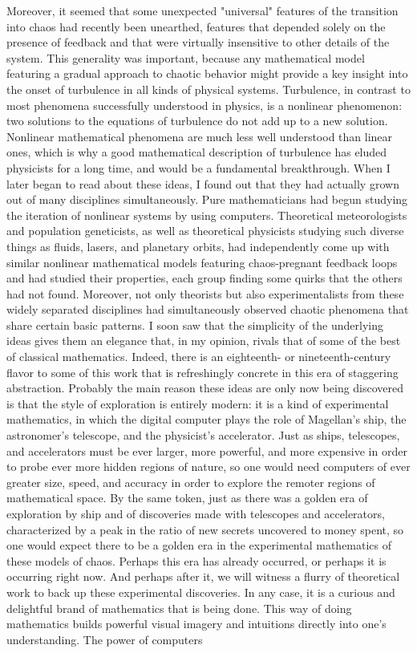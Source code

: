         Moreover, it seemed that some unexpected "universal" features of the
transition into chaos had recently been unearthed, features that depended solely on the
presence of feedback and that were virtually insensitive to other details of the system.
This generality was important, because any mathematical model featuring a gradual
approach to chaotic behavior might provide a key insight into the onset of turbulence
in all kinds of physical systems. Turbulence, in contrast to most phenomena
successfully understood in physics, is a nonlinear phenomenon: two solutions to the
equations of turbulence do not add up to a new solution. Nonlinear mathematical
phenomena are much less well understood than linear ones, which is why a good
mathematical description of turbulence has eluded physicists for a long time, and
would be a fundamental breakthrough.
        When I later began to read about these ideas, I found out that they had actually
grown out of many disciplines simultaneously. Pure mathematicians had begun
studying the iteration of nonlinear systems by using computers. Theoretical
meteorologists and population geneticists, as well as theoretical physicists studying
such diverse things as fluids, lasers, and planetary orbits, had independently come up
with similar nonlinear mathematical models featuring chaos-pregnant feedback loops
and had studied their properties, each group finding some quirks that the others had
not found. Moreover, not only theorists but also experimentalists from these widely
separated disciplines had simultaneously observed chaotic phenomena that share
certain basic patterns. I soon saw that the simplicity of the underlying ideas gives
them an elegance that, in my opinion, rivals that of some of the best of classical
mathematics. Indeed, there is an eighteenth- or nineteenth-century flavor to some of
this work that is refreshingly concrete in this era of staggering abstraction.
        Probably the main reason these ideas are only now being discovered is that the
style of exploration is entirely modern: it is a kind of experimental mathematics, in
which the digital computer plays the role of Magellan's ship, the astronomer's
telescope, and the physicist's accelerator. Just as ships, telescopes, and accelerators
must be ever larger, more powerful, and more expensive in order to probe ever more
hidden regions of nature, so one would need computers of ever greater size, speed,
and accuracy in order to explore the remoter regions of mathematical space. By the
same token, just as there was a golden era of exploration by ship and of discoveries
made with telescopes and accelerators, characterized by a peak in the ratio of new
secrets uncovered to money spent, so one would expect there to be a golden era in the
experimental mathematics of these models of chaos. Perhaps this era has already
occurred, or perhaps it is occurring right now. And perhaps after it, we will witness a
flurry of theoretical work to back up these experimental discoveries.
        In any case, it is a curious and delightful brand of mathematics that is being
done. This way of doing mathematics builds powerful visual imagery and intuitions
directly into one's understanding. The power of computers




